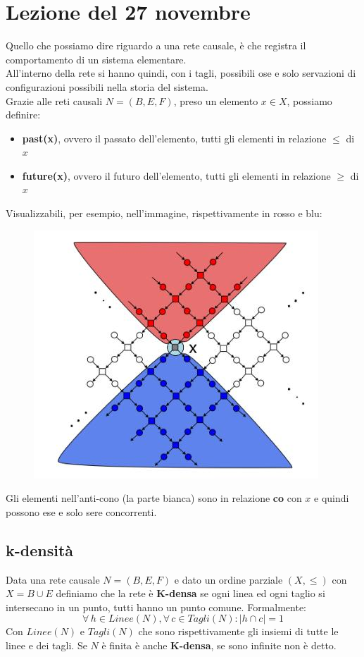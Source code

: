 \section{Lezione del 27 novembre}
Quello che possiamo dire riguardo a una rete causale, è che registra il comportamento di un sistema elementare.\\
All'interno della rete si hanno quindi, con i tagli, possibili ose e solo servazioni di configurazioni possibili nella storia del sistema.\\
Grazie alle reti causali $N=(B,E,F)$, preso un elemento $x\in X$, possiamo definire:
\begin{itemize}
    \item \textbf{past(x)}, ovvero il passato dell'elemento, tutti gli elementi in relazione $\leq$ di $x$
    \item \textbf{future(x)}, ovvero il futuro dell'elemento, tutti gli elementi in relazione $\geq$ di $x$
\end{itemize}
    Visualizzabili, per esempio, nell'immagine, rispettivamente in rosso e blu:
    \begin{figure}[H]
    \centering
    \includegraphics[scale = 0.5]{IMM/cono_di_luce.jpg} 
    \end{figure}
Gli elementi nell'anti-cono (la parte bianca) sono in relazione \textbf{co} con $x$ e quindi possono ese e solo sere concorrenti.

\subsection{k-densità}
Data una rete causale $N=(B,E,F)$ e dato un ordine parziale $(X, \leq)$ con $X=B\cup E$ definiamo che la rete è \textbf{K-densa} se ogni linea ed ogni taglio si intersecano in un punto, tutti hanno un punto comune. Formalmente: \[\forall\,h\in Linee(N),\forall\,c\in Tagli(N):|h\cap c|=1\] Con $Linee(N)$ e $Tagli(N)$ che sono rispettivamente gli insiemi di tutte le linee e dei tagli. Se $N$ è finita è anche \textbf{K-densa}, se sono infinite non è detto.\\

